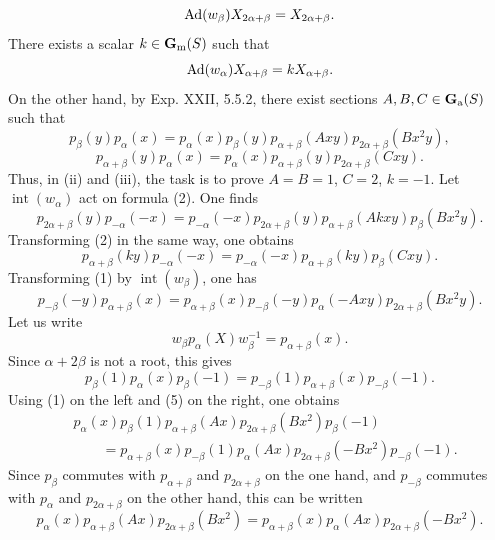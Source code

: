\[
\operatorname{Ad}(w_\beta)X_{2\alpha+\beta}=X_{2\alpha+\beta}.
\]
There exists a scalar $k\in\mathbf{G}_{\mathrm{m}}(S)$ such that
\[
\operatorname{Ad}(w_\alpha)X_{\alpha+\beta}=kX_{\alpha+\beta}.
\]
On the other hand, by Exp. XXII, 5.5.2, there exist sections $A,B,C\in\mathbf{G}_{\mathrm{a}}(S)$ such that
\begin{equation}\tag{1}
p_\beta(y)p_\alpha(x)=p_\alpha(x)p_\beta(y)p_{\alpha+\beta}(Axy)p_{2\alpha+\beta}(Bx^2y),
\end{equation}
\begin{equation}\tag{2}
p_{\alpha+\beta}(y)p_\alpha(x)=p_\alpha(x)p_{\alpha+\beta}(y)p_{2\alpha+\beta}(Cxy).
\end{equation}
Thus, in (ii) and (iii), the task is to prove $A=B=1$, $C=2$, $k=-1$.
Let $\operatorname{int}(w_\alpha)$ act on formula (2). One finds
\begin{equation}\tag{3}
p_{2\alpha+\beta}(y)p_{-\alpha}(-x)=p_{-\alpha}(-x)p_{2\alpha+\beta}(y)p_{\alpha+\beta}(Akxy)p_\beta(Bx^2y).
\end{equation}
Transforming (2) in the same way, one obtains
\begin{equation}\tag{4}
p_{\alpha+\beta}(ky)p_{-\alpha}(-x)=p_{-\alpha}(-x)p_{\alpha+\beta}(ky)p_\beta(Cxy).
\end{equation}
Transforming (1) by $\operatorname{int}(w_\beta)$, one has
\begin{equation}\tag{5}
p_{-\beta}(-y)p_{\alpha+\beta}(x)=p_{\alpha+\beta}(x)p_{-\beta}(-y)p_\alpha(-Axy)p_{2\alpha+\beta}(Bx^2y).
\end{equation}
Let us write
\[
w_\beta p_\alpha(X)w_\beta^{-1}=p_{\alpha+\beta}(x).
\]
Since $\alpha+2\beta$ is not a root, this gives
\[
p_\beta(1)p_\alpha(x)p_\beta(-1)=p_{-\beta}(1)p_{\alpha+\beta}(x)p_{-\beta}(-1).
\]
Using (1) on the left and (5) on the right, one obtains
\[
\begin{aligned}
&p_\alpha(x)p_\beta(1)p_{\alpha+\beta}(Ax)p_{2\alpha+\beta}(Bx^2)p_\beta(-1)\\
&\qquad=p_{\alpha+\beta}(x)p_{-\beta}(1)p_\alpha(Ax)p_{2\alpha+\beta}(-Bx^2)p_{-\beta}(-1).
\end{aligned}
\]
Since $p_\beta$ commutes with $p_{\alpha+\beta}$ and $p_{2\alpha+\beta}$ on the one hand, and $p_{-\beta}$ commutes with $p_\alpha$ and $p_{2\alpha+\beta}$ on the other hand, this can be written
\[
p_\alpha(x)p_{\alpha+\beta}(Ax)p_{2\alpha+\beta}(Bx^2)=p_{\alpha+\beta}(x)p_\alpha(Ax)p_{2\alpha+\beta}(-Bx^2).
\]
